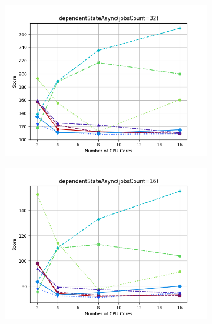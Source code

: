 \documentclass{article}
\begin{document}
\begin{figure}[H]
    \begin{subfigure}[b]{0.48\textwidth}
        \includegraphics[width=\linewidth]{plots/dependentStateAsync(jobsCount=32).png}
    \end{subfigure}
    \begin{subfigure}[b]{0.48\textwidth}
        \includegraphics[width=\linewidth]{plots/dependentStateAsync(jobsCount=16).png}
    \end{subfigure}

    \vspace{1em}


\end{figure}
\end{document}
